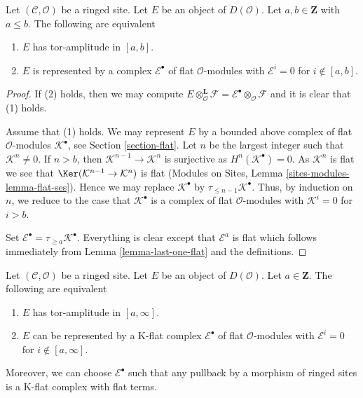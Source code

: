 \begin{lemma}
\label{lemma-tor-amplitude}
Let $(\mathcal{C}, \mathcal{O})$ be a ringed site. Let $E$ be an object of
$D(\mathcal{O})$. Let $a, b \in \mathbf{Z}$ with $a \leq b$. The following
are equivalent
\begin{enumerate}
\item $E$ has tor-amplitude in $[a, b]$.
\item $E$ is represented by a complex
$\mathcal{E}^\bullet$ of flat $\mathcal{O}$-modules with
$\mathcal{E}^i = 0$ for $i \not \in [a, b]$.
\end{enumerate}
\end{lemma}

\begin{proof}
If (2) holds, then we may compute
$E \otimes_\mathcal{O}^\mathbf{L} \mathcal{F} =
\mathcal{E}^\bullet \otimes_\mathcal{O} \mathcal{F}$
and it is clear that (1) holds.

\medskip\noindent
Assume that (1) holds. We may represent $E$ by a bounded above complex
of flat $\mathcal{O}$-modules $\mathcal{K}^\bullet$, see
Section \ref{section-flat}.
Let $n$ be the largest integer such that $\mathcal{K}^n \not = 0$.
If $n > b$, then $\mathcal{K}^{n - 1} \to \mathcal{K}^n$ is surjective as
$H^n(\mathcal{K}^\bullet) = 0$. As $\mathcal{K}^n$ is flat we see that
$\Ker(\mathcal{K}^{n - 1} \to \mathcal{K}^n)$ is flat
(Modules on Sites, Lemma \ref{sites-modules-lemma-flat-ses}).
Hence we may replace $\mathcal{K}^\bullet$ by
$\tau_{\leq n - 1}\mathcal{K}^\bullet$. Thus, by induction on $n$, we
reduce to the case that $\mathcal{K}^\bullet$ is a complex of flat
$\mathcal{O}$-modules with $\mathcal{K}^i = 0$ for $i > b$.

\medskip\noindent
Set $\mathcal{E}^\bullet = \tau_{\geq a}\mathcal{K}^\bullet$.
Everything is clear except that $\mathcal{E}^a$ is flat
which follows immediately from Lemma \ref{lemma-last-one-flat}
and the definitions.
\end{proof}

\begin{lemma}
\label{lemma-bounded-below-tor-amplitude}
Let $(\mathcal{C}, \mathcal{O})$ be a ringed site. Let $E$ be an object of
$D(\mathcal{O})$. Let $a \in \mathbf{Z}$. The following
are equivalent
\begin{enumerate}
\item $E$ has tor-amplitude in $[a, \infty]$.
\item $E$ can be represented by a K-flat complex $\mathcal{E}^\bullet$
of flat $\mathcal{O}$-modules with $\mathcal{E}^i = 0$ for
$i \not \in [a, \infty]$.
\end{enumerate}
Moreover, we can choose $\mathcal{E}^\bullet$ such that any pullback
by a morphism of ringed sites is a K-flat complex with flat terms.
\end{lemma}

